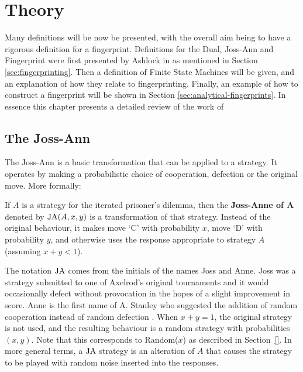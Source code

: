 
\chapter{Theory}\label{cha:theory}

Many definitions will be now be presented, with the overall aim being to have a rigorous definition for a fingerprint.
Definitions for the Dual, Joss-Ann and Fingerprint were first presented by Ashlock in \cite{Ashlock2004} as mentioned in Section \ref{sec:fingerprinting}.
Then a definition of Finite State Machines will be given, and an explanation of how they relate to fingerprinting.
Finally, an example of how to construct a fingerprint will be shown in Section \ref{sec:analytical-fingerprints}.
In essence this chapter presents a detailed review of the work of
\cite{Ashlock...}  %

\section{The Joss-Ann}\label{sec:joss-ann}
The Joss-Ann is a basic transformation that can be applied to a strategy.
It operates by making a probabilistic choice of cooperation, defection or the original move.
More formally:

\begin{definition}\label{def:joss-ann}
If $A$ is a strategy for the iterated prisoner's dilemma, then the
\textbf{Joss-Anne of A} denoted by $\text{JA}(A, x, y)$ is a transformation of that strategy.
Instead of the original behaviour, it makes move `C' with probability $x$, move
`D' with probability $y$, and otherwise uses the response appropriate to
strategy $A$ (assuming $x+y < 1$).
\end{definition}

The notation $\text{JA}$ comes from the initials of the names Joss and Anne.
Joss was a strategy submitted to one of Axelrod’s original tournaments and it would occasionally defect without provocation in the hopes of a slight improvement in score.
Anne is the first name of A. Stanley who suggested the addition of random cooperation instead of random defection \cite{Ashlock2008}.
When $x + y = 1$, the original strategy is not used, and the resulting behaviour
is a random strategy with probabilities $(x, y)$. Note that this corresponds to
Random($x$) as described in Section~\ref{}.  %
In more general terms, a $\text{JA}$ strategy is an alteration of $A$ that causes the strategy to be played with random noise inserted into the responses.

